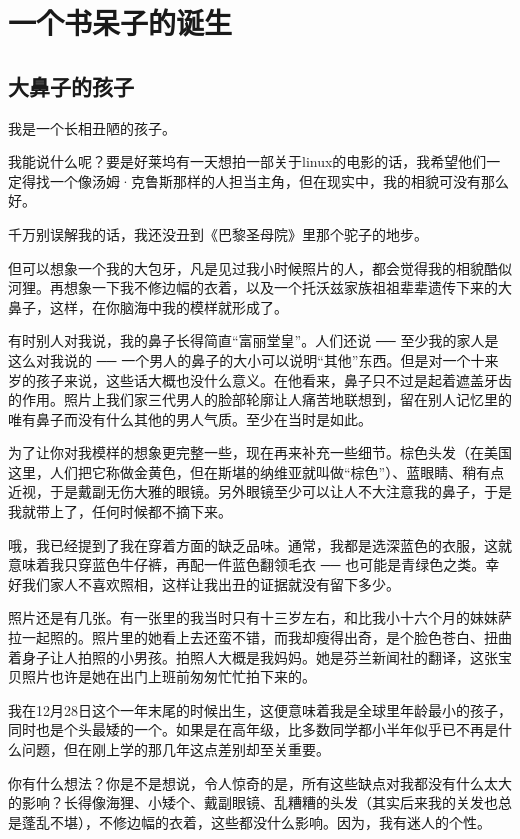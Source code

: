\chapter{一个书呆子的诞生}
\section{大鼻子的孩子}

我是一个长相丑陋的孩子。

我能说什么呢？要是好莱坞有一天想拍一部关于linux的电影的话，我希望他们一定得找一个像汤姆·克鲁斯那样的人担当主角，但在现实中，我的相貌可没有那么好。

千万别误解我的话，我还没丑到《巴黎圣母院》里那个驼子的地步。

但可以想象一个我的大包牙，凡是见过我小时候照片的人，都会觉得我的相貌酷似河狸。再想象一下我不修边幅的衣着，以及一个托沃兹家族祖祖辈辈遗传下来的大鼻子，这样，在你脑海中我的模样就形成了。

有时别人对我说，我的鼻子长得简直“富丽堂皇”。人们还说 ── 至少我的家人是这么对我说的 ── 一个男人的鼻子的大小可以说明“其他”东西。但是对一个十来岁的孩子来说，这些话大概也没什么意义。在他看来，鼻子只不过是起着遮盖牙齿的作用。照片上我们家三代男人的脸部轮廓让人痛苦地联想到，留在别人记忆里的唯有鼻子而没有什么其他的男人气质。至少在当时是如此。

为了让你对我模样的想象更完整一些，现在再来补充一些细节。棕色头发（在美国这里，人们把它称做金黄色，但在斯堪的纳维亚就叫做“棕色”）、蓝眼睛、稍有点近视，于是戴副无伤大雅的眼镜。另外眼镜至少可以让人不大注意我的鼻子，于是我就带上了，任何时候都不摘下来。

哦，我已经提到了我在穿着方面的缺乏品味。通常，我都是选深蓝色的衣服，这就意味着我只穿蓝色牛仔裤，再配一件蓝色翻领毛衣 ── 也可能是青绿色之类。幸好我们家人不喜欢照相，这样让我出丑的证据就没有留下多少。

照片还是有几张。有一张里的我当时只有十三岁左右，和比我小十六个月的妹妹萨拉一起照的。照片里的她看上去还蛮不错，而我却瘦得出奇，是个脸色苍白、扭曲着身子让人拍照的小男孩。拍照人大概是我妈妈。她是芬兰新闻社的翻译，这张宝贝照片也许是她在出门上班前匆匆忙忙拍下来的。

我在12月28日这个一年末尾的时候出生，这便意味着我是全球里年龄最小的孩子，同时也是个头最矮的一个。如果是在高年级，比多数同学都小半年似乎已不再是什么问题，但在刚上学的那几年这点差别却至关重要。

你有什么想法？你是不是想说，令人惊奇的是，所有这些缺点对我都没有什么太大的影响？长得像海狸、小矮个、戴副眼镜、乱糟糟的头发（其实后来我的关发也总是蓬乱不堪），不修边幅的衣着，这些都没什么影响。因为，我有迷人的个性。


